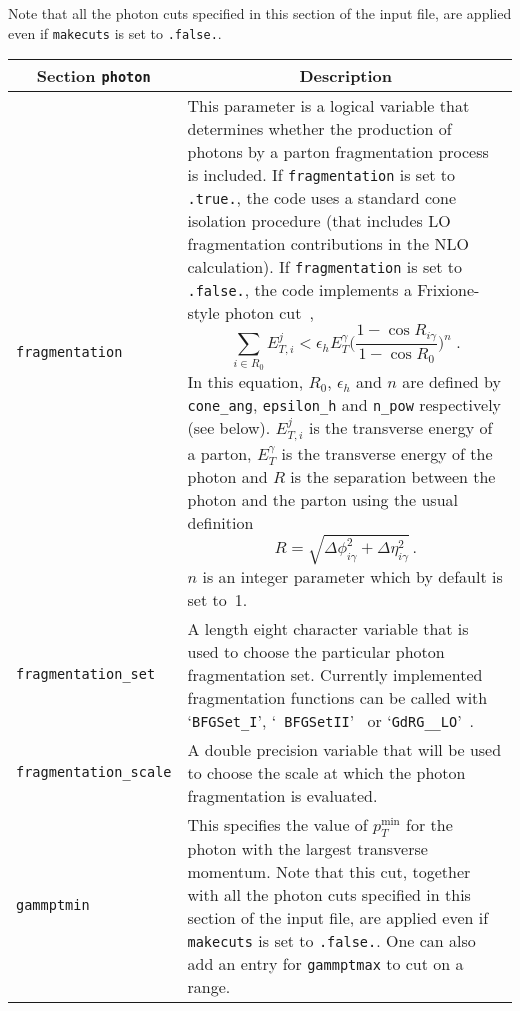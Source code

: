 		Note that all the photon cuts specified in this section of the input file, are applied even if {\tt makecuts} is set to {\tt .false.}.
	\begin{longtable}{p{3.5cm}p{12cm}}
		\hline
		\multicolumn{1}{c}{{\textbf{Section} \texttt{photon}}} & \multicolumn{1}{c}{{\textbf{Description}}} \\ 
		\hline
		{\tt fragmentation} &  This parameter is a logical variable that determines whether the production of photons 
		by a parton 
		fragmentation process is included. If {\tt fragmentation} is set to {\tt .true.}, the code uses a standard 
		cone isolation
		procedure (that includes LO fragmentation contributions in the NLO calculation).
		If {\tt fragmentation} is set to {\tt .false.}, the code implements
		a Frixione-style photon cut~\cite{Frixione:1998jh},
		\begin{equation}
		\sum_{i \in R_0} E_{T,i}^j  < \epsilon_h E_{T}^{\gamma} \bigg(\frac{1-\cos{R_{i\gamma}}}{1-\cos{R_0}}\bigg)^{n} 
		\;.
		\label{frixeq}
		\end{equation}
		In this equation, $R_0$, $\epsilon_h$ and $n$ are defined by {\tt cone\_ang}, {\tt epsilon\_h} 
		and {\tt n\_pow}  respectively (see below).
		$E_{T,i}^{j}$ is the transverse energy of a parton, $E_{T}^\gamma$ is the
		transverse energy of the photon and $R$ is the separation between the photon and the parton using the 
		usual definition
		\begin{equation}
		R=\sqrt{\Delta\phi_{i\gamma}^2+\Delta\eta_{i\gamma}^2} \,.
		\end{equation}
		$n$ is an integer parameter which by default is set to~1. \\
		
		{\tt fragmentation\_set} & A length eight character variable that is used to choose the particular photon 
		fragmentation set.
		Currently implemented fragmentation functions can be called with `{\tt BFGSet\_I}', `{\tt 
			BFGSetII}'~\cite{Bourhis:1997yu} or `{\tt GdRG\_\_LO}'~\cite{GehrmannDeRidder:1998ba}. \\
		
		{\tt fragmentation\_scale} & A double precision variable that will be used to choose the scale 
		at which the photon fragmentation is evaluated. \\
		
		{\tt gammptmin} & This specifies the value
		of $p_T^{\mathrm{min}}$ for the photon with the largest transverse momentum.
		Note that this cut, together with all the photon cuts specified in this section
		of the input file, are applied even if {\tt makecuts} is set to {\tt .false.}.
		One can also add an entry for \texttt{gammptmax} to cut on a range. \\
		

\end{longtable}
